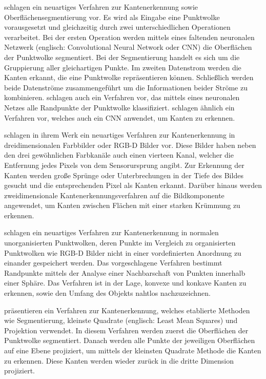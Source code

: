 \Textcite{hu_jsenet_2020} schlagen ein neuartiges Verfahren zur Kantenerkennung sowie Oberflächensegmentierung vor. Es wird als Eingabe eine Punktwolke vorausgesetzt und gleichzeitig durch zwei unterschiedlichen Operationen verarbeitet. Bei der ersten Operation werden mittels eines faltenden neuronalen Netzwerk (englisch: Convolutional Neural Network oder CNN) die Oberflächen der Punktwolke segmentiert. Bei der Segmentierung handelt es sich um die Gruppierung aller gleichartigen Punkte. Im zweiten Datenstrom werden die Kanten erkannt, die eine Punktwolke repräsentieren können. Schließlich werden beide Datenströme zusammengeführt um die Informationen beider Ströme zu kombinieren. \Textcite{bazazian_edc-net_2021} schlagen auch ein Verfahren vor, das mittels eines neuronalen Netzes alle Randpunkte der Punktwolke klassifiziert. \Textcite{himeur_pcednet_2021} schlagen ähnlich ein Verfahren vor, welches auch ein CNN anwendet, um Kanten zu erkennen. 

\Textcite{choi_rgb-d_2013} schlagen in ihrem Werk ein neuartiges Verfahren zur Kantenerkennung in dreidimensionalen Farbbilder oder RGB-D Bilder vor. Diese Bilder haben neben den drei gewöhnlichen Farbkanäle auch einen vierteen Kanal, welcher die Entfernung jedes Pixels von dem Sensorursprung angibt. Zur Erkennung der Kanten werden große Sprünge oder Unterbrechungen in der Tiefe des Bildes gesucht und die entsprechenden Pixel als Kanten erkannt. Darüber hinaus werden zweidimensionale Kantenerkennungsverfahren auf die Bildkomponente angewendet, um Kanten zwischen Flächen mit einer starken Krümmung zu erkennen. 

\Textcite{mineo_novel_2019} schlagen ein neuartiges Verfahren zur Kantenerkennung in normalen unorganisierten Punktwolken, deren Punkte im Vergleich zu organisierten Punktwolken wie RGB-D Bilder nicht in einer vordefinierten Anordnung zu einander gespeichert werden. Das vorgeschlagene Verfahren bestimmt Randpunkte mittels der Analyse einer Nachbarschaft von Punkten innerhalb einer Sphäre. Das Verfahren ist in der Lage, konvexe und konkave Kanten zu erkennen, sowie den Umfang des Objekts nahtlos nachzuzeichnen.

\Textcite{lu_fast_2019} präsentieren ein Verfahren zur Kantenerkennung, welches etablierte Methoden wie Segmentierung, kleinste Quadrate (englisch: Least Mean Squares) und Projektion verwendet. In diesem Verfahren werden zuerst die Oberflächen der Punktwolke segmentiert. Danach werden alle Punkte der jeweiligen Oberflächen auf eine Ebene projiziert, um mittels der kleinsten Quadrate Methode die Kanten zu erkennen. Diese Kanten werden wieder zurück in die dritte Dimension projiziert.

